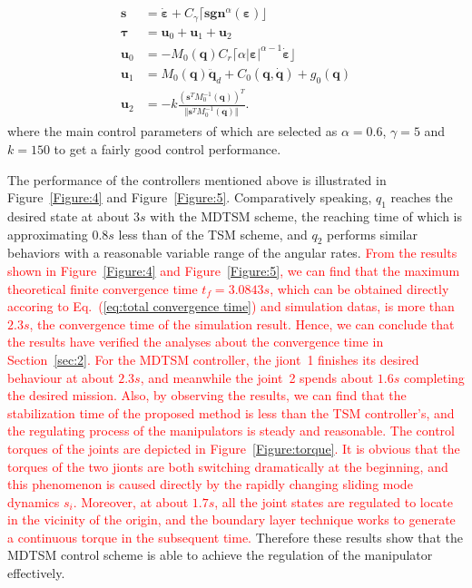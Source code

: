 \documentclass[3p]{elsarticle}
\theoremstyle{plain}
\theoremstyle{remark}
\begin{document}
\begin{align}
\begin{split}
\bm s &= \dot{\bm \varepsilon}+C_\gamma\lceil\bm{sgn}^\alpha(\bm \varepsilon)\rfloor\\
\bm\tau &= \bm u_0+\bm u_1 +\bm u_2\\
\bm u_0 &= -M_0(\bm q)C_r\lceil\alpha\vert\bm\varepsilon\vert^{\alpha-1}\dot{\bm \varepsilon}\rfloor\\
\bm u_1 &= M_0(\bm q)\ddot {\bm q}_d+C_0(\bm q,\dot {\bm q})+g_0(\bm q)\\
\bm u_2 &= -k\frac{(\bm s^TM_0^{-1}(\bm q))^T}{\Vert\bm s^TM_0^{-1}(\bm q)\Vert}.
\end{split}
\end{align}
where the main control parameters of which are selected as $\alpha = 0.6$, $\gamma = 5$ and $k = 150$ to get a fairly good control performance.\par
The performance of the controllers mentioned above is illustrated in Figure~\ref{Figure:4} and Figure~\ref{Figure:5}. Comparatively speaking, $q_1$ reaches the desired state at about $3s$ with the MDTSM scheme, the reaching time of which is approximating $0.8s$ less than of the TSM scheme, and $q_2$ performs similar behaviors with a reasonable variable range of the angular rates. \textcolor{red}{From the results shown in Figure~\ref{Figure:4} and Figure~\ref{Figure:5}, we can find that the maximum theoretical finite convergence time $t_f=3.0843s$, which can be obtained directly accoring to Eq.~(\ref{eq:total convergence time}) and simulation datas, is more than $2.3s$, the convergence time of the simulation result. Hence, we can conclude that the results have verified the analyses about the convergence time in Section~\ref{sec:2}. For the MDTSM controller, the jiont~1 finishes its desired behaviour at about $2.3s$, and meanwhile the joint~2 spends about $1.6s$ completing the desired mission. Also, by observing the results, we can find that the stabilization time of the proposed method is less  than the TSM controller's, and the regulating process of the manipulators is steady and reasonable. The control torques of the joints are depicted in Figure~\ref{Figure:torque}. It is obvious that the torques of the two jionts are both switching dramatically at the beginning, and this phenomenon is caused directly by the rapidly changing sliding mode dynamics $s_i$. Moreover, at about $1.7s$, all the joint states are regulated to locate in the vicinity of the origin, and the boundary layer technique works to generate a continuous torque in the subsequent time.} Therefore these results show that the MDTSM control scheme is able to achieve the regulation of the manipulator effectively.
\end{document}
